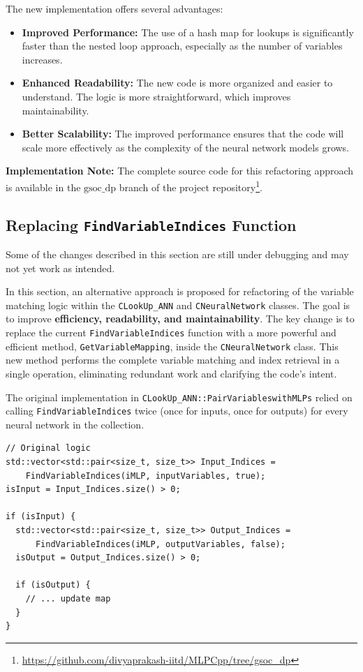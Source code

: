 \documentclass{article}
\begin{document}
The new implementation offers several advantages:
\begin{itemize}
    \item \textbf{Improved Performance:} The use of a hash map for lookups is significantly faster than the nested loop approach, especially as the number of variables increases.
    \item \textbf{Enhanced Readability:} The new code is more organized and easier to understand. The logic is more straightforward, which improves maintainability.
    \item \textbf{Better Scalability:} The improved performance ensures that the code will scale more effectively as the complexity of the neural network models grows.
\end{itemize}
\noindent\textbf{Implementation Note:} The complete source code for this refactoring approach is available in the \texttt{$\text{gsoc\_dp}$} branch of the project repository\footnote{\url{https://github.com/divyaprakash-iitd/MLPCpp/tree/gsoc_dp}}.

\subsection{Replacing \texttt{FindVariableIndices} Function}
\begin{tcolorbox}[colback=bg,colframe=red!60!black,title=Disclaimer]
Some of the changes described in this section are still under debugging and may not yet work as intended.
\end{tcolorbox}
In this section, an alternative approach is proposed for refactoring of the variable matching logic within the \texttt{CLookUp\_ANN} and \texttt{CNeuralNetwork} classes. The goal is to improve \textbf{efficiency, readability, and maintainability}. The key change is to replace the current \texttt{FindVariableIndices} function with a more powerful and efficient method, \texttt{GetVariableMapping}, inside the \texttt{CNeuralNetwork} class. This new method performs the complete variable matching and index retrieval in a single operation, eliminating redundant work and clarifying the code's intent.

The original implementation in \texttt{CLookUp\_ANN::PairVariableswithMLPs} relied on calling \texttt{FindVariableIndices} twice (once for inputs, once for outputs) for every neural network in the collection.

\begin{verbatim}
// Original logic
std::vector<std::pair<size_t, size_t>> Input_Indices =
    FindVariableIndices(iMLP, inputVariables, true);
isInput = Input_Indices.size() > 0;

if (isInput) {
  std::vector<std::pair<size_t, size_t>> Output_Indices =
      FindVariableIndices(iMLP, outputVariables, false);
  isOutput = Output_Indices.size() > 0;

  if (isOutput) {
    // ... update map
  }
}
\end{verbatim}
\end{document}
